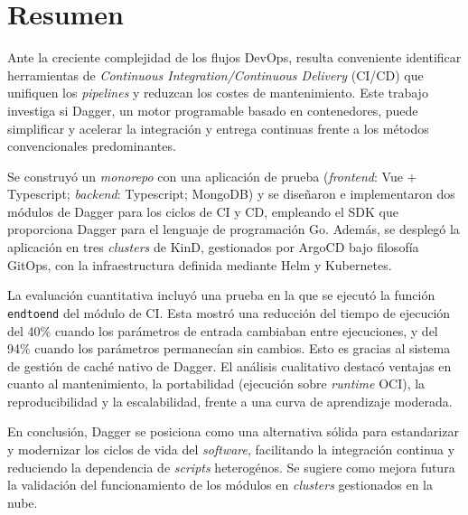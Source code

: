 \pagestyle{plain}
\chapter*{Resumen}

Ante la creciente complejidad de los flujos DevOps, resulta conveniente identificar herramientas de \textit{Continuous Integration/Continuous Delivery} (CI/CD) que unifiquen los \textit{pipelines} y reduzcan los costes de mantenimiento. Este trabajo investiga si Dagger, un motor programable basado en contenedores, puede simplificar y acelerar la integración y entrega continuas frente a los métodos convencionales predominantes.

Se construyó un \textit{monorepo} con una aplicación de prueba (\textit{frontend}: Vue + Typescript; \textit{backend}: Typescript; MongoDB) y se diseñaron e implementaron dos módulos de Dagger para los ciclos de CI y CD, empleando el SDK que proporciona Dagger para el lenguaje de programación Go. Además, se desplegó la aplicación en tres \textit{clusters} de KinD, gestionados por ArgoCD bajo filosofía GitOps, con la infraestructura definida mediante Helm y Kubernetes.

La evaluación cuantitativa incluyó una prueba en la que se ejecutó la función \texttt{endtoend} del módulo de CI. Esta mostró una reducción del tiempo de ejecución del 40\% cuando los parámetros de entrada cambiaban entre ejecuciones, y del 94\% cuando los parámetros permanecían sin cambios. Esto es gracias al sistema de gestión de caché nativo de Dagger. El análisis cualitativo destacó ventajas en cuanto al mantenimiento, la portabilidad (ejecución sobre \textit{runtime} OCI), la reproducibilidad y la escalabilidad, frente a una curva de aprendizaje moderada.

En conclusión, Dagger se posiciona como una alternativa sólida para estandarizar y modernizar los ciclos de vida del \textit{software}, facilitando la integración continua y reduciendo la dependencia de \textit{scripts} heterogénos. Se sugiere como mejora futura la validación del funcionamiento de los módulos en \textit{clusters} gestionados en la nube.
